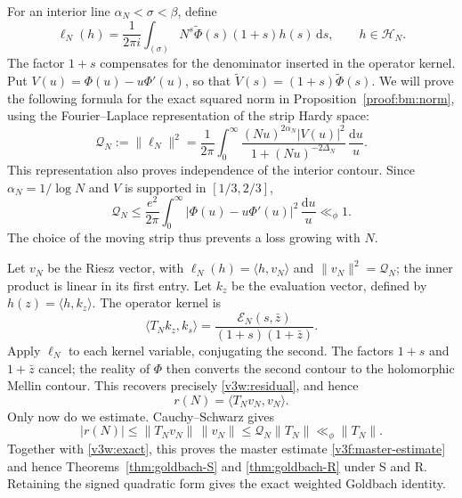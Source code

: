 \documentclass[12pt,a4paper]{amsart}
\numberwithin{equation}{section}
\def\le{\leqslant}
\theoremstyle{plain}
\theoremstyle{definition}
\theoremstyle{remark}
\begin{document}
For an interior line $\alpha_N<\sigma<\beta$, define
\begin{equation}\label{bm:functional}
 \ell_N(h)=\frac1{2\pi i}\int_{(\sigma)}
          N^s\widetilde\Phi(s)(1+s)h(s)\,\mathrm{d}s,
 \qquad h\in\mathcal H_N.
\end{equation}
The factor $1+s$ compensates for the denominator inserted in
the operator kernel. Put $V(u)=\Phi(u)-u\Phi'(u)$, so that
$\widetilde V(s)=(1+s)\widetilde\Phi(s)$.
We will prove the following formula for the exact squared norm in
Proposition~\ref{proof:bm:norm}, using the Fourier--Laplace
representation of the strip Hardy space:
\begin{equation}\label{bm:norm-integral}
 \mathcal Q_N:=\|\ell_N\|^2
 =\frac1{2\pi}\int_0^\infty
       \frac{(Nu)^{2\alpha_N}|V(u)|^2}
            {1+(Nu)^{-2\Delta_N}}\,\frac{\mathrm{d}u}{u}.
\end{equation}
This representation also proves independence of the interior contour.
Since $\alpha_N=1/\log N$ and $V$ is supported in $[1/3,2/3]$,
\begin{equation}\label{bm:uniform-norm}
 \mathcal Q_N\le\frac{e^2}{2\pi}
       \int_0^\infty|\Phi(u)-u\Phi'(u)|^2\,\frac{\mathrm{d}u}{u}
       \ll_\phi1.
\end{equation}
The choice of the moving strip thus prevents a loss growing with $N$.

Let $v_N$ be the Riesz vector, with
$\ell_N(h)=\langle h,v_N\rangle$ and
$\|v_N\|^2=\mathcal Q_N$; the inner product is linear in its first
entry. Let $k_z$ be the evaluation vector, defined by
$h(z)=\langle h,k_z\rangle$. The operator kernel is
\[
 \langle T_Nk_z,k_s\rangle
   =\frac{\mathscr E_N(s,\bar z)}{(1+s)(1+\bar z)}.
\]
Apply $\ell_N$ to each kernel variable, conjugating the second.
The factors $1+s$ and $1+\bar z$ cancel; the reality of $\Phi$
then converts the second contour to the holomorphic Mellin contour.
This recovers precisely \eqref{v3w:residual}, and hence
\begin{equation}\label{bm:quadratic-form}
 r(N)=\langle T_Nv_N,v_N\rangle.
\end{equation}
Only now do we estimate. Cauchy--Schwarz gives
\begin{equation}\label{bm:direct-error}
 |r(N)|\le\|T_Nv_N\|\,\|v_N\|
       \le\mathcal Q_N\|T_N\|\ll_\phi\|T_N\|.
\end{equation}
Together with \eqref{v3w:exact}, this proves the master estimate
\eqref{v3f:master-estimate} and hence
Theorems~\ref{thm:goldbach-S} and \ref{thm:goldbach-R} under S and R.
Retaining the signed quadratic form gives the exact weighted
Goldbach identity.
\end{document}
